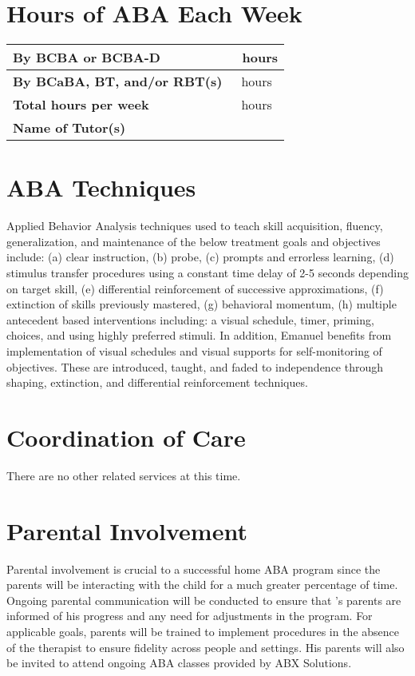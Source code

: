 \documentclass{article}
\def\clientfirstname{}
\def\BCBAhours{}
\def\tutorhours{}
\def\totalhours{}
\def\tutor{}
\begin{document}
\section{Hours of ABA Each Week}

	\begin{tabular}{|l||l|} 
		\hline
		\textbf{By BCBA or BCBA-D} & \BCBAhours\ hours\\
		\hline
		\textbf{By BCaBA, BT, and/or RBT(s)} &  \tutorhours\ hours\\
		\hline
		\textbf{Total hours per week} & \totalhours\ hours\\
		\hline
		\textbf{Name of Tutor(s)} & \tutor \\
		\hline
	\end{tabular}

\section{ABA Techniques}
Applied Behavior Analysis techniques used to teach skill acquisition, fluency, generalization, and maintenance of the below treatment goals and objectives include: (a) clear instruction, (b) probe, (c) prompts and errorless learning, (d) stimulus transfer procedures using a constant time delay of 2-5 seconds depending on target skill, (e) differential reinforcement of successive approximations, (f) extinction of skills previously mastered, (g) behavioral momentum, (h) multiple antecedent based interventions including: a visual schedule, timer, priming, choices, and using highly preferred stimuli. In addition, Emanuel benefits from implementation of visual schedules and visual supports for self-monitoring of objectives.  These are introduced, taught, and faded to independence through shaping, extinction, and differential reinforcement techniques. 

\section{Coordination of Care}
There are no other related services at this time.

\section{Parental Involvement}
Parental involvement is crucial to a successful home ABA program since the parents will be interacting with the child for a much greater percentage of time.  Ongoing parental communication will be conducted to ensure that \clientfirstname’s parents are informed of his progress and any need for adjustments in the program.  For applicable goals, parents will be trained to implement procedures in the absence of the therapist to ensure fidelity across people and settings.  His parents will also be invited to attend ongoing ABA classes provided by ABX Solutions.
\end{document}
